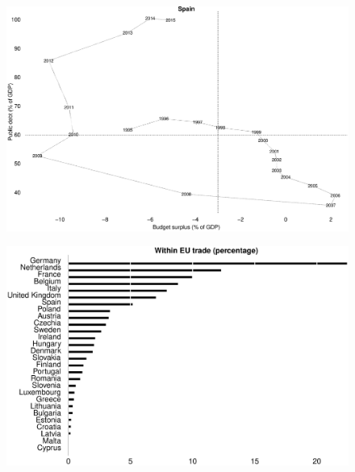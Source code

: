 \documentclass{beamer}
\begin{document}
\begin{frame}
  \begin{figure}
    \includegraphics[scale=.3]{spain.eps}
  \end{figure}
\end{frame}

\begin{frame}
  \begin{figure}
    \includegraphics[scale=.3]{within_trade.eps}
  \end{figure}
\end{frame}
\end{document}
